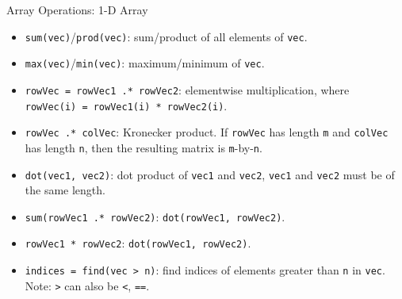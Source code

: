 \begin{frame}[fragile]{Array Operations: 1-D Array}
\protect\hypertarget{array-operations-1-d-array}{}
\begin{itemize}[<+->]
\tightlist
\item
  \texttt{sum(vec)}/\texttt{prod(vec)}: sum/product of all elements of
  \texttt{vec}.
\item
  \texttt{max(vec)}/\texttt{min(vec)}: maximum/minimum of \texttt{vec}.
\item
  \texttt{rowVec\ =\ rowVec1\ .*\ rowVec2}: elementwise multiplication,
  where \texttt{rowVec(i)\ =\ rowVec1(i)\ *\ rowVec2(i)}.
\item
  \texttt{rowVec\ .*\ colVec}: Kronecker product. If \texttt{rowVec} has
  length \texttt{m} and \texttt{colVec} has length \texttt{n}, then the
  resulting matrix is \texttt{m}-by-\texttt{n}.
\item
  \texttt{dot(vec1,\ vec2)}: dot product of \texttt{vec1} and
  \texttt{vec2}, \texttt{vec1} and \texttt{vec2} must be of the same
  length.
\item
  \texttt{sum(rowVec1\ .*\ rowVec2)}: \texttt{dot(rowVec1,\ rowVec2)}.
\item
  \texttt{rowVec1\ *\ rowVec2\textquotesingle{}}:
  \texttt{dot(rowVec1,\ rowVec2)}.
\item
  \texttt{indices\ =\ find(vec\ \textgreater{}\ n)}: find indices of
  elements greater than \texttt{n} in \texttt{vec}. Note:
  \texttt{\textgreater{}} can also be \texttt{\textless{}}, \texttt{==}.
\end{itemize}
\end{frame}

